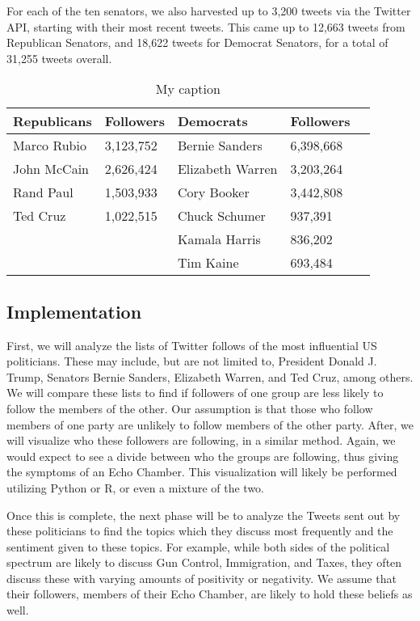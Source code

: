 \documentclass[journal]{IEEEtran}
\begin{document}
For each of the ten senators, we also harvested up to 3,200 tweets via the Twitter API, starting with their most recent tweets. This came up to 12,663 tweets from Republican Senators, and 18,622 tweets for Democrat Senators, for a total of 31,255 tweets overall.

\begin{table}[]
\centering
\caption{My caption}
\label{my-label}
\begin{tabular}{ll|lll}
\hline
Republicans & Followers & Democrats        & Followers &  \\ \hline
Marco Rubio & 3,123,752 & Bernie Sanders   & 6,398,668 &  \\
John McCain & 2,626,424 & Elizabeth Warren & 3,203,264 &  \\
Rand Paul   & 1,503,933 & Cory Booker      & 3,442,808 &  \\
Ted Cruz    & 1,022,515 & Chuck Schumer    & 937,391   &  \\
            &           & Kamala Harris    & 836,202   &  \\
            &           & Tim Kaine        & 693,484   &  \\ \cline{1-4}
\end{tabular}
\end{table}
	
	\subsection{Implementation}
	
	First, we will analyze the lists of Twitter follows of the most influential US politicians. These may include, but are not limited to, President Donald J. Trump, Senators Bernie Sanders, Elizabeth Warren, and Ted Cruz, among others. We will compare these lists to find if followers of one group are less likely to follow the members of the other. Our assumption is that those who follow members of one party are unlikely to follow members of the other party. After, we will visualize who these followers are following, in a similar method. Again, we would expect to see a divide between who the groups are following, thus giving the symptoms of an Echo Chamber. This visualization will likely be performed utilizing Python or R, or even a mixture of the two. 
	
	Once this is complete, the next phase will be to analyze the Tweets sent out by these politicians to find the topics which they discuss most frequently and the sentiment given to these topics. For example, while both sides of the political spectrum are likely to discuss Gun Control, Immigration, and Taxes, they often discuss these with varying amounts of positivity or negativity. We assume that their followers, members of their Echo Chamber, are likely to hold these beliefs as well. 
	
\end{document}
